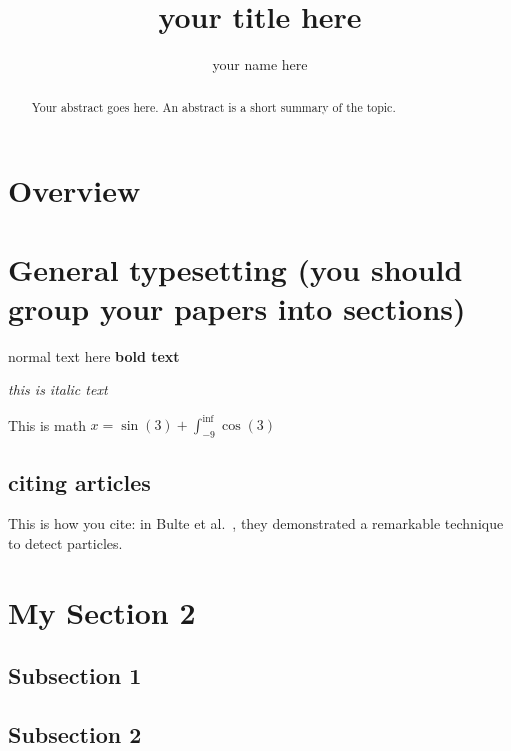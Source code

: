 \documentclass[letterpaper, 10 pt, conference]{ieeeconf}
\begin{document}
\author{your name here}
\title{your title here}
\maketitle

\begin{abstract}
Your abstract goes here.  An abstract is a short summary of the topic.

\end{abstract}

\section{Overview}



\section{General typesetting (you should group your papers into sections)}

normal text here
{\bf  bold text}

\emph{this is italic text}

This is math
$x  = \sin(3) + \int_{-9} ^{\inf} \cos(3)$

\subsection{citing articles}
 
 This is how you cite:  in  Bulte et al.~\cite{bulte2001magnetodendrimers}, they demonstrated a remarkable technique to detect particles.
 
 \section{My Section 2}

\subsection{Subsection 1}




\subsection{Subsection 2}

 


\end{document}
